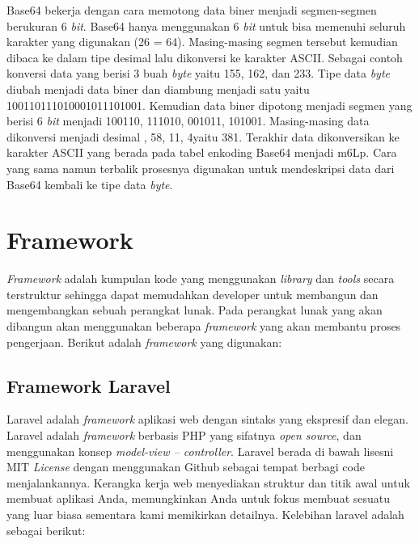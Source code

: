 Base64 bekerja dengan cara memotong data biner menjadi segmen-segmen berukuran 6 \textit{bit}. Base64 hanya menggunakan 6 \textit{bit} untuk bisa memenuhi seluruh karakter yang digunakan (26 = 64). Masing-masing segmen tersebut kemudian dibaca ke dalam tipe desimal lalu dikonversi ke karakter ASCII. Sebagai contoh konversi data yang berisi 3 buah \textit{byte} yaitu 155, 162, dan 233. Tipe data \textit{byte} diubah menjadi data biner dan diambung menjadi satu yaitu 100110111010001011101001. Kemudian data biner dipotong menjadi segmen yang berisi 6 \textit{bit} menjadi 100110, 111010, 001011, 101001. Masing-masing data dikonversi menjadi desimal , 58, 11, 4yaitu 381. Terakhir data dikonversikan ke karakter ASCII yang berada pada tabel enkoding Base64 menjadi m6Lp. Cara yang sama namun terbalik prosesnya digunakan untuk mendeskripsi data dari Base64 kembali ke tipe data \textit{byte}.\cite{juan:22:pengumpulan}

\section{Framework}
\label{sec:framework}
\textit{Framework} adalah kumpulan kode yang menggunakan \textit{library} dan \textit{tools} secara terstruktur sehingga dapat memudahkan developer untuk membangun dan mengembangkan sebuah perangkat lunak. Pada perangkat lunak yang akan dibangun akan menggunakan beberapa \textit{framework} yang akan membantu proses pengerjaan. Berikut adalah \textit{framework} yang digunakan:

\subsection{Framework Laravel}
Laravel adalah \textit{framework} aplikasi web dengan sintaks yang ekspresif dan elegan. Laravel adalah \textit{framework} berbasis PHP yang sifatnya \textit{open source}, dan menggunakan konsep \textit{model-view – controller}. Laravel berada di bawah lisesni MIT \textit{License} dengan menggunakan Github sebagai tempat berbagi code menjalankannya. Kerangka kerja web menyediakan struktur dan titik awal untuk membuat aplikasi Anda, memungkinkan Anda untuk fokus membuat sesuatu yang luar biasa sementara kami memikirkan detailnya. Kelebihan laravel adalah sebagai berikut:

